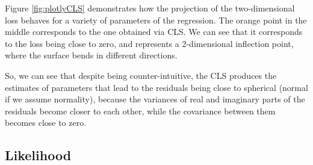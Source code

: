 \documentclass[
]{book}
\begin{document}
Figure \ref{fig:plotlyCLS} demonstrates how the projection of the two-dimensional loss behaves for a variety of parameters of the regression. The orange point in the middle corresponds to the one obtained via CLS. We can see that it corresponds to the loss being close to zero, and represents a 2-dimensional inflection point, where the surface bends in different directions.

So, we can see that despite being counter-intuitive, the CLS produces the estimates of parameters that lead to the residuals being close to spherical (normal if we assume normality), because the variances of real and imaginary parts of the residuals become closer to each other, while the covariance between them becomes close to zero.

\hypertarget{SCLREstimationLikelihood}{%
\subsection{Likelihood}\label{SCLREstimationLikelihood}}
\end{document}
